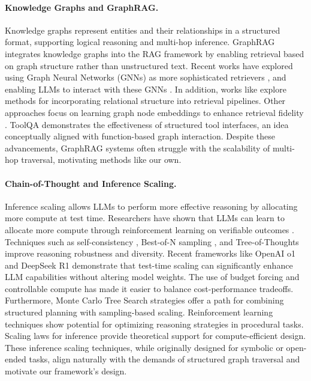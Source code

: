 \paragraph{Knowledge Graphs and GraphRAG.}
Knowledge graphs represent entities and their relationships in a structured format, supporting logical reasoning and multi-hop inference. GraphRAG \citep{edge2025localglobalgraphrag} integrates knowledge graphs into the RAG framework by enabling retrieval based on graph structure rather than unstructured text. Recent works have explored using Graph Neural Networks (GNNs) as more sophisticated retrievers \citep{peng2024graphretrievalaugmentedgenerationsurvey, zhang2025surveygraphretrievalaugmentedgeneration}, and enabling LLMs to interact with these GNNs \citep{9046288, wu2025inference}. In addition, works like \citep{he2024gretrieverretrievalaugmentedgenerationtextual} explore methods for incorporating relational structure into retrieval pipelines. Other approaches focus on learning graph node embeddings to enhance retrieval fidelity \citep{devlin-etal-2019-bert}. ToolQA \citep{zhuang2023toolqa} demonstrates the effectiveness of structured tool interfaces, an idea conceptually aligned with function-based graph interaction. Despite these advancements, GraphRAG systems often struggle with the scalability of multi-hop traversal, motivating methods like our own.

\paragraph{Chain-of-Thought and Inference Scaling.}
Inference scaling allows LLMs to perform more effective reasoning by allocating more compute at test time. Researchers have shown that LLMs can learn to allocate more compute through reinforcement learning on verifiable outcomes \citep{lambert2025tulu3pushingfrontiers}. Techniques such as self-consistency \citep{wang2023selfconsistency}, Best-of-N sampling \citep{jinnai2025regularizedbestofnsamplingminimum}, and Tree-of-Thoughts \citep{yao2023tree} improve reasoning robustness and diversity. Recent frameworks like OpenAI o1 \citep{openai2024o1} and DeepSeek R1 \citep{deepseekai2025deepseekr1incentivizingreasoningcapability} demonstrate that test-time scaling can significantly enhance LLM capabilities without altering model weights. The use of budget forcing and controllable compute \citep{muennighoff2025s1simpletesttimescaling} has made it easier to balance cost-performance tradeoffs. Furthermore, Monte Carlo Tree Search strategies \citep{zhang2024rest} offer a path for combining structured planning with sampling-based scaling. Reinforcement learning techniques \citep{gulcehre2023reinforcedselftrainingrestlanguage} show potential for optimizing reasoning strategies in procedural tasks. Scaling laws for inference \citep{wu2025inference} provide theoretical support for compute-efficient design. These inference scaling techniques, while originally designed for symbolic or open-ended tasks, align naturally with the demands of structured graph traversal and motivate our framework’s design.

